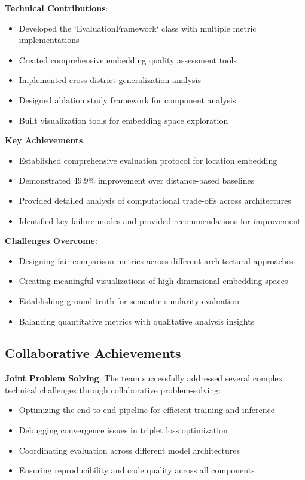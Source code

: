 \textbf{Technical Contributions}:
\begin{itemize}
    \item Developed the `EvaluationFramework` class with multiple metric implementations
    \item Created comprehensive embedding quality assessment tools
    \item Implemented cross-district generalization analysis
    \item Designed ablation study framework for component analysis
    \item Built visualization tools for embedding space exploration
\end{itemize}

\textbf{Key Achievements}:
\begin{itemize}
    \item Established comprehensive evaluation protocol for location embedding
    \item Demonstrated 49.9\% improvement over distance-based baselines
    \item Provided detailed analysis of computational trade-offs across architectures
    \item Identified key failure modes and provided recommendations for improvement
\end{itemize}

\textbf{Challenges Overcome}:
\begin{itemize}
    \item Designing fair comparison metrics across different architectural approaches
    \item Creating meaningful visualizations of high-dimensional embedding spaces
    \item Establishing ground truth for semantic similarity evaluation
    \item Balancing quantitative metrics with qualitative analysis insights
\end{itemize}

\subsection{Collaborative Achievements}

\textbf{Joint Problem Solving}:
The team successfully addressed several complex technical challenges through collaborative problem-solving:
\begin{itemize}
    \item Optimizing the end-to-end pipeline for efficient training and inference
    \item Debugging convergence issues in triplet loss optimization
    \item Coordinating evaluation across different model architectures
    \item Ensuring reproducibility and code quality across all components
\end{itemize}

